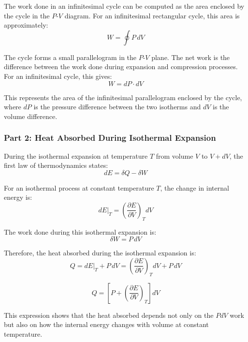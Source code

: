 \documentclass[10pt,twocoloumn]{article}
\begin{document}
The work done in an infinitesimal cycle can be computed as the area enclosed by the cycle in the $P$-$V$ diagram. For an infinitesimal rectangular cycle, this area is approximately:
\begin{equation}W = \oint P \, dV\end{equation}

The cycle forms a small parallelogram in the $P$-$V$ plane. The net work is the difference between the work done during expansion and compression processes. For an infinitesimal cycle, this gives:
\begin{equation}\boxed{W = dP \cdot dV}\end{equation}

This represents the area of the infinitesimal parallelogram enclosed by the cycle, where $dP$ is the pressure difference between the two isotherms and $dV$ is the volume difference.

\subsubsection*{Part 2: Heat Absorbed During Isothermal Expansion}

During the isothermal expansion at temperature $T$ from volume $V$ to $V + dV$, the first law of thermodynamics states:
\begin{equation}dE = \delta Q - \delta W\end{equation}

For an isothermal process at constant temperature $T$, the change in internal energy is:
\begin{equation}dE\big|_T = \left(\frac{\partial E}{\partial V}\right)_T dV\end{equation}

The work done during this isothermal expansion is:
\begin{equation}\delta W = P \, dV\end{equation}

Therefore, the heat absorbed during the isothermal expansion is:
\begin{equation}Q = dE\big|_T + P \, dV = \left(\frac{\partial E}{\partial V}\right)_T dV + P \, dV\end{equation}

\begin{equation}\boxed{Q = \left[P + \left(\frac{\partial E}{\partial V}\right)_T\right] dV}\end{equation}

This expression shows that the heat absorbed depends not only on the $PdV$ work but also on how the internal energy changes with volume at constant temperature.
\end{document}
